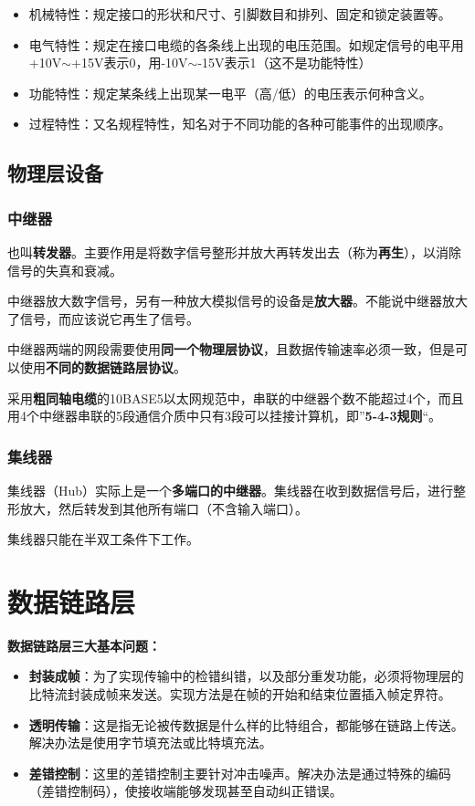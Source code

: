 \documentclass[12pt, a4paper, oneside]{ctexart}
\begin{document}
\begin{itemize}
    \item 机械特性：规定接口的形状和尺寸、引脚数目和排列、固定和锁定装置等。
    \item 电气特性：规定在接口电缆的各条线上出现的电压范围。如规定信号的电平用+10V$\sim$+15V表示0，用-10V$\sim$-15V表示1（这不是功能特性）
    \item 功能特性：规定某条线上出现某一电平（高/低）的电压表示何种含义。
    \item 过程特性：又名规程特性，知名对于不同功能的各种可能事件的出现顺序。
\end{itemize}

\subsection{物理层设备}

\subsubsection{中继器}

也叫\textbf{转发器}。主要作用是将数字信号整形并放大再转发出去（称为\textbf{再生}），以消除信号的失真和衰减。

中继器放大数字信号，另有一种放大模拟信号的设备是\textbf{放大器}。不能说中继器放大了信号，而应该说它再生了信号。

中继器两端的网段需要使用\textbf{同一个物理层协议}，且数据传输速率必须一致，但是可以使用\textbf{不同的数据链路层协议}。

采用\textbf{粗同轴电缆}的10BASE5以太网规范中，串联的中继器个数不能超过4个，而且用4个中继器串联的5段通信介质中只有3段可以挂接计算机，即”\textbf{5-4-3规则}“。

\subsubsection{集线器}

集线器（Hub）实际上是一个\textbf{多端口的中继器}。集线器在收到数据信号后，进行整形放大，然后转发到其他所有端口（不含输入端口）。

集线器只能在半双工条件下工作。

\section{数据链路层}

\textbf{数据链路层三大基本问题：}
\begin{itemize}
    \item {\bf 封装成帧}：为了实现传输中的检错纠错，以及部分重发功能，必须将物理层的比特流封装成帧来发送。实现方法是在帧的开始和结束位置插入帧定界符。
    \item {\bf 透明传输}：这是指无论被传数据是什么样的比特组合，都能够在链路上传送。解决办法是使用字节填充法或比特填充法。
    \item {\bf 差错控制}：这里的差错控制主要针对冲击噪声。解决办法是通过特殊的编码（差错控制码），使接收端能够发现甚至自动纠正错误。
\end{itemize}
\end{document}
